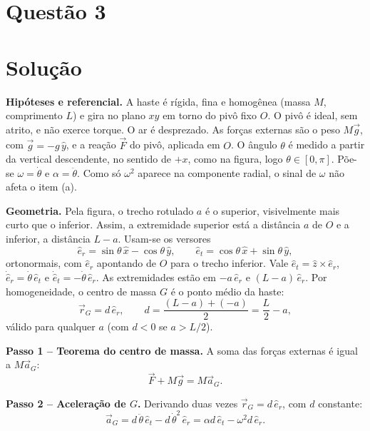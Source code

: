 \documentclass{article}%
\begin{document}
\section*{Questão 3}

\section*{Solução}

\textbf{Hipóteses e referencial.} A haste é rígida, fina e homogênea (massa $M$, comprimento $L$) e gira no plano $xy$ em torno do pivô fixo $O$. O pivô é ideal, sem atrito, e não exerce torque. O ar é desprezado. As forças externas são o peso $M\vec g$, com $\vec g=-g\,\hat y$, e a reação $\vec F$ do pivô, aplicada em $O$. O ângulo $\theta$ é medido a partir da vertical descendente, no sentido de $+x$, como na figura, logo $\theta\in[0,\pi]$. Põe-se $\omega=\dot\theta$ e $\alpha=\ddot\theta$. Como só $\omega^2$ aparece na componente radial, o sinal de $\omega$ não afeta o item (a).

\textbf{Geometria.} Pela figura, o trecho rotulado $a$ é o superior, visivelmente mais curto que o inferior. Assim, a extremidade superior está a distância $a$ de $O$ e a inferior, a distância $L-a$. Usam-se os versores
\[
\hat e_r=\sin\theta\,\hat x-\cos\theta\,\hat y,\qquad \hat e_t=\cos\theta\,\hat x+\sin\theta\,\hat y,
\]
ortonormais, com $\hat e_r$ apontando de $O$ para o trecho inferior. Vale $\hat e_t=\hat z\times\hat e_r$, $\dot{\hat e}_r=\dot\theta\,\hat e_t$ e $\dot{\hat e}_t=-\dot\theta\,\hat e_r$. As extremidades estão em $-a\,\hat e_r$ e $(L-a)\,\hat e_r$. Por homogeneidade, o centro de massa $G$ é o ponto médio da haste:
\[
\vec r_G=d\,\hat e_r,\qquad d=\frac{(L-a)+(-a)}{2}=\frac{L}{2}-a,
\]
válido para qualquer $a$ (com $d<0$ se $a>L/2$).

\textbf{Passo 1 -- Teorema do centro de massa.} A soma das forças externas é igual a $M\vec a_G$:
\[
\vec F+M\vec g=M\vec a_G.
\]

\textbf{Passo 2 -- Aceleração de $G$.} Derivando duas vezes $\vec r_G=d\,\hat e_r$, com $d$ constante:
\[
\vec a_G=d\,\ddot\theta\,\hat e_t-d\,\dot\theta^2\,\hat e_r=\alpha d\,\hat e_t-\omega^2 d\,\hat e_r.
\]
\end{document}
